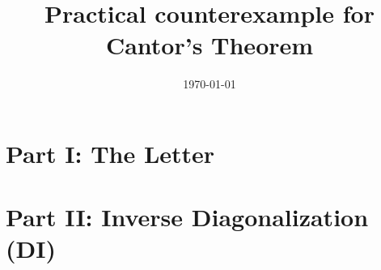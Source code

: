 \documentclass[notitlepage]{report}
\title{Practical counterexample for Cantor's Theorem }
\date{\today}
\begin{document}
	
	\maketitle
	\thispagestyle{empty}
	
	
		
	
	\tableofcontents
	\listoffigures
	\listoftables
	
	\part{Part I: The Letter}

		
		
		
		
		
		
		
		
		
		
		
		
		
		
		
	
	\part{Part II: Inverse Diagonalization (DI)}
	
			
		 
		
		
		
		
\end{document}
